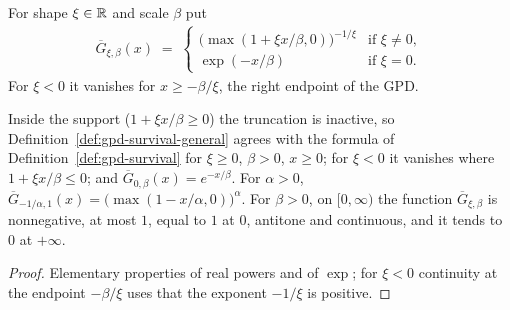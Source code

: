 \begin{definition}
  \label{def:gpd-survival-general}
  \leanok
  For shape $\xi \in \mathbb{R}$ and scale $\beta$ put
  \begin{align*}
    \overline{G}_{\xi,\beta}(x) \; = \;
    \begin{cases}
      \big( \max(1 + \xi x / \beta, 0) \big)^{-1/\xi} & \text{if } \xi \ne 0, \\
      \exp(-x/\beta) & \text{if } \xi = 0 .
    \end{cases}
  \end{align*}
  For $\xi < 0$ it vanishes for $x \ge -\beta/\xi$, the right endpoint of the GPD.
\end{definition}

\begin{lemma}
  \label{lem:gpd-general-properties}
  \leanok
  Inside the support ($1 + \xi x/\beta \ge 0$) the truncation is inactive, so
  Definition~\ref{def:gpd-survival-general} agrees with the formula of
  Definition~\ref{def:gpd-survival} for $\xi \ge 0$, $\beta > 0$, $x \ge 0$; for $\xi < 0$ it
  vanishes where $1 + \xi x/\beta \le 0$; and $\overline{G}_{0,\beta}(x) = e^{-x/\beta}$. For
  $\alpha > 0$, $\overline{G}_{-1/\alpha, 1}(x) = \big( \max(1 - x/\alpha, 0) \big)^\alpha$. For
  $\beta > 0$, on $[0, \infty)$ the function $\overline{G}_{\xi,\beta}$ is nonnegative, at most
  $1$, equal to $1$ at $0$, antitone and continuous, and it tends to $0$ at $+\infty$.
\end{lemma}
\begin{proof}
  \leanok
  Elementary properties of real powers and of $\exp$; for $\xi < 0$ continuity at the endpoint
  $-\beta/\xi$ uses that the exponent $-1/\xi$ is positive.
\end{proof}

